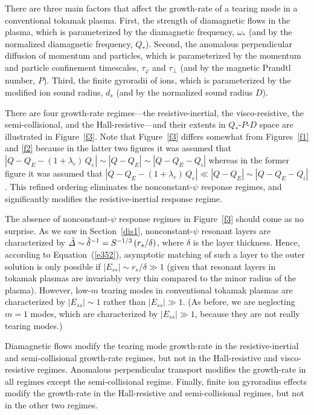 \documentclass[notitlepage,12pt]{article}
\begin{document}
There are three main factors that
affect the growth-rate of a tearing mode in a conventional tokamak plasma. First, the strength of diamagnetic flows in the plasma, which is parameterized by the
diamagnetic frequency, $\omega_\ast$ (and by the normalized diamagnetic frequency, $Q_\ast$). Second, the  anomalous perpendicular diffusion of momentum and particles, which is parameterized by the momentum and particle confinement
timescales, $\tau_\varphi$ and $\tau_\perp$ (and by the magnetic Prandtl number, $P$). Third, the
finite gyroradii of ions, which is parameterized by the modified ion sound radius, $d_s$ (and by the normalized
sound radius $D$).

 There are four growth-rate regimes---the resistive-inertial, the visco-resistive, the semi-collisional, and the Hall-resistive---and their extents in $Q_\ast$-$P$-$D$ space are illustrated in Figure~\ref{f3}.
Note that Figure~\ref{f3} differs somewhat from Figures~\ref{f1} and \ref{f2} because in the latter two
figures it was assumed that $|Q-Q_E-(1+\lambda_e)\,Q_e|\sim |Q-Q_E|\sim |Q-Q_E-Q_i|$ whereas
in the former figure it was assumed that $|Q-Q_E-(1+\lambda_e)\,Q_e|\ll |Q-Q_E|\sim |Q-Q_E-Q_i|$.
This refined ordering eliminates the nonconstant-$\psi$ response regimes, and significantly modifies the
resistive-inertial response regime. 

The absence of nonconstant-$\psi$ response regimes in Figure~\ref{f3}
should come as no surprise. As we saw in Section~\ref{dis1}, nonconstant-$\psi$ resonant layers
are characterized by $\hat{\mit\Delta}\sim\hat{\delta}^{-1}= S^{-1/3}\,(r_s/\delta)$, where $\delta$
is the layer thickness. Hence, according to Equation~(\ref{e352}), asymptotic matching of such a
layer to the outer solution is only possible if $|E_{ss}|\sim r_s/\delta \gg 1$ (given that resonant
layers in tokamak plasmas are invariably very thin compared to the minor radius of the plasma). However,
low-$m$ tearing modes in conventional tokamak plasmas are characterized by $|E_{ss}|\sim 1$ rather than
$|E_{ss}|\gg 1$. (As before, we are neglecting $m=1$ modes, which are characterized by
$|E_{ss}|\gg 1$, because they are not really tearing modes.)

Diamagnetic flows modify the tearing mode growth-rate in the resistive-inertial and semi-collisional
growth-rate regimes, but not in the Hall-resistive and visco-resistive regimes. Anomalous perpendicular
transport modifies the growth-rate in all regimes except the semi-collisional regime. Finally, finite ion gyroradius
effects modify the growth-rate in the Hall-resistive and semi-collisional regimes, but not in the other two
regimes. 
\end{document}
